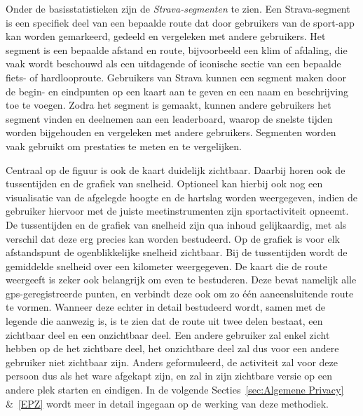 Onder de basisstatistieken zijn de \textit{Strava-segmenten} te zien. Een
Strava-segment is een specifiek deel van een bepaalde route dat door gebruikers
van de sport-app kan worden gemarkeerd, gedeeld en vergeleken met andere
gebruikers. Het segment is een bepaalde afstand en route, bijvoorbeeld een klim
of afdaling, die vaak wordt beschouwd als een uitdagende of iconische sectie
van een bepaalde fiets- of hardlooproute. Gebruikers van Strava kunnen een
segment maken door de begin- en eindpunten op een kaart aan te geven en een
naam en beschrijving toe te voegen. Zodra het segment is gemaakt, kunnen andere
gebruikers het segment vinden en deelnemen aan een leaderboard, waarop de
snelste tijden worden bijgehouden en vergeleken met andere gebruikers.
Segmenten worden vaak gebruikt om prestaties te meten en te vergelijken.

Centraal op de figuur is ook de kaart duidelijk zichtbaar. Daarbij horen ook de
tussentijden en de grafiek van snelheid. Optioneel kan hierbij ook nog een
visualisatie van de afgelegde hoogte en de hartslag worden weergegeven, indien
de gebruiker hiervoor met de juiste meetinstrumenten zijn sportactiviteit
opneemt. De tussentijden en de grafiek van snelheid zijn qua inhoud
gelijkaardig, met als verschil dat deze erg precies kan worden bestudeerd. Op
de grafiek is voor elk afstandspunt de ogenblikkelijke snelheid zichtbaar. Bij
de tussentijden wordt de gemiddelde snelheid over een kilometer weergegeven. De
kaart die de route weergeeft is zeker ook belangrijk om even te bestuderen.
Deze bevat namelijk alle \ac{gps}-geregistreerde punten, en verbindt deze ook
om zo één aaneensluitende route te vormen. Wanneer deze echter in detail
bestudeerd wordt, samen met de legende die aanwezig is, is te zien dat de route
uit twee delen bestaat, een zichtbaar deel en een onzichtbaar deel. Een andere
gebruiker zal enkel zicht hebben op de het zichtbare deel, het onzichtbare deel
zal dus voor een andere gebruiker niet zichtbaar zijn. Anders geformuleerd, de
activiteit zal voor deze persoon dus als het ware afgekapt zijn, en zal in zijn
zichtbare versie op een andere plek starten en eindigen. In de volgende
Secties~\ref{sec:Algemene Privacy} \&~\ref{EPZ} wordt meer in detail ingegaan
op de werking van deze methodiek.

